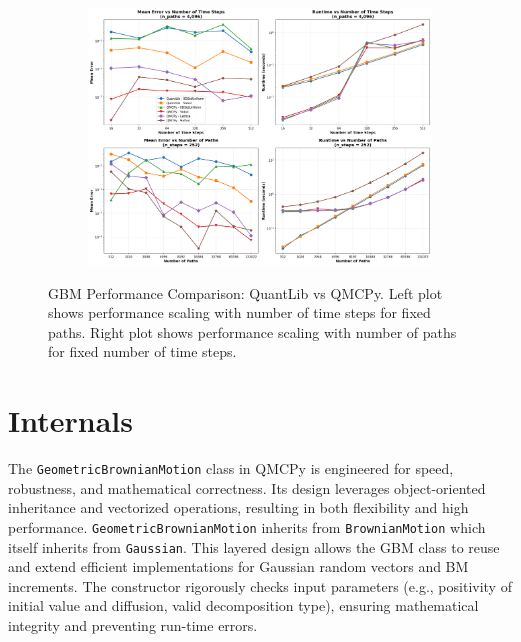 \documentclass{article}
\begin{document}
\begin{figure}[htbp]
    \centering
    \begin{subfigure}{1\textwidth}
        \centering
        \includegraphics[width=\textwidth]{images/figure_7.png}
        \label{subfig:performance_steps2}
    \end{subfigure}

    \caption{GBM Performance Comparison: QuantLib vs QMCPy. Left plot shows performance scaling with number of time steps for fixed paths. Right plot shows performance scaling with number of paths for fixed number of time steps.}
    \label{fig:gbm_performance2}
\end{figure}

\section{Internals}

The \texttt{GeometricBrownianMotion} class in QMCPy is engineered for speed, robustness, and mathematical correctness. Its design leverages object-oriented inheritance and vectorized operations, resulting in both flexibility and high performance.
\texttt{GeometricBrownianMotion} inherits from \texttt{BrownianMotion} which itself inherits from \texttt{Gaussian}. This layered design allows the GBM class to reuse and extend efficient implementations for Gaussian random vectors and BM increments.
The constructor rigorously checks input parameters (e.g., positivity of initial value and diffusion, valid decomposition type), ensuring mathematical integrity and preventing run-time errors.
\end{document}
